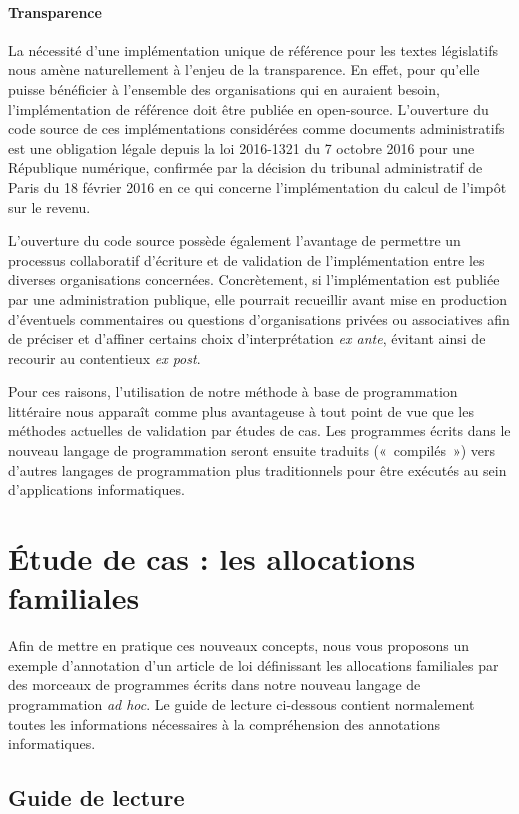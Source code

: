 \documentclass[12pt, french]{article}
\begin{document}
\paragraph{Transparence} La nécessité d'une implémentation unique de référence pour les textes législatifs nous amène naturellement à l'enjeu de la transparence. En effet, pour qu'elle puisse bénéficier à l'ensemble des organisations qui en auraient besoin, l'implémentation de référence doit être publiée en open-source. L'ouverture du code source de ces implémentations considérées comme documents administratifs est une obligation légale depuis la loi 2016-1321 du 7 octobre 2016 pour une République numérique, confirmée par la décision du tribunal administratif de Paris du 18 février 2016 en ce qui concerne l'implémentation du calcul de l'impôt sur le revenu.

L'ouverture du code source possède également l'avantage de permettre un processus collaboratif d'écriture et de validation de l'implémentation entre les diverses organisations concernées. Concrètement, si l'implémentation est publiée par une administration publique, elle pourrait recueillir avant mise en production d'éventuels commentaires ou questions d'organisations privées ou associatives afin de préciser et d'affiner certains choix d'interprétation \emph{ex ante}, évitant ainsi de recourir au contentieux \emph{ex post}.

Pour ces raisons, l'utilisation de notre méthode à base de programmation littéraire nous apparaît comme plus avantageuse à tout point de vue que les méthodes actuelles de validation par études de cas. Les programmes écrits dans le nouveau langage de programmation seront ensuite traduits (« compilés ») vers d'autres langages de programmation plus traditionnels pour être exécutés au sein d'applications informatiques.

\section{Étude de cas : les allocations familiales}
Afin de mettre en pratique ces nouveaux concepts, nous vous proposons un exemple d'annotation d'un article de loi  définissant les allocations familiales par des morceaux de programmes écrits dans notre nouveau langage de programmation \emph{ad hoc}. Le guide de lecture ci-dessous contient normalement toutes les informations nécessaires à la compréhension des annotations informatiques.

\subsection{Guide de lecture}
\end{document}
